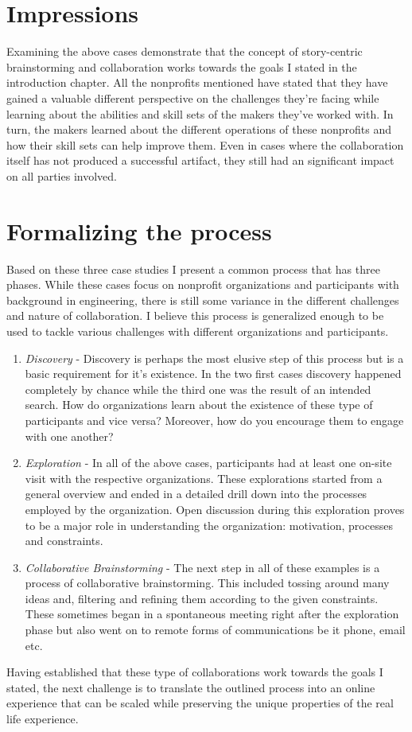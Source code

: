 \section{Impressions}

Examining the above cases demonstrate that the concept of story-centric brainstorming and collaboration works towards the goals I stated in the introduction chapter. All the nonprofits mentioned have stated that they have gained a valuable different perspective on the challenges they're facing while learning about the abilities and skill sets of the makers they've worked with. In turn, the makers learned about the different operations of these nonprofits and how their skill sets can help improve them. Even in cases where the collaboration itself has not produced a successful artifact, they still had an significant impact on all parties involved. 

\section{Formalizing the process}

Based on these three case studies I present a common process that has three phases. While these cases focus on nonprofit organizations and participants with background in engineering, there is still some variance in the different challenges and nature of collaboration. I believe this process is generalized enough to be used to tackle various challenges with different organizations and participants. 

\begin{enumerate}

\item \textit{Discovery} - Discovery is perhaps the most elusive step of this process but is a basic requirement for it's existence. In the two first cases discovery happened completely by chance while the third one was the result of an intended search. How do organizations learn about the existence of these type of participants and vice versa? Moreover, how do you encourage them to engage with one another? 

\item \textit{Exploration} - In all of the above cases, participants had at least one on-site visit with the respective organizations. These explorations started from a general overview and ended in a detailed drill down into the processes employed by the organization. Open discussion during this exploration proves to be a major role in understanding the organization: motivation, processes and constraints. 

\item \textit{Collaborative Brainstorming} - The next step in all of these examples is a process of collaborative brainstorming. This included tossing around many ideas and, filtering and refining them according to the given constraints. These sometimes began in a spontaneous meeting right after the exploration phase but also went on to remote forms of communications be it phone, email etc.

\end{enumerate}
 
Having established that these type of collaborations work towards the goals I stated, the next challenge is to translate the outlined process into an online experience that can be scaled while preserving the unique properties of the real life experience. 